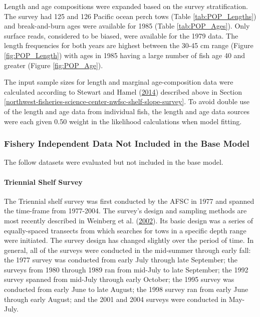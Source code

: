 \documentclass[12pt,]{article}
\let\oldparagraph\paragraph
\renewcommand{\paragraph}[1]{\oldparagraph{#1}\mbox{}}
\begin{document}
Length and age compositions were expanded based on the survey
stratification. The survey had 125 and 126 Pacific ocean perch tows
(Table \ref{tab:POP_Lengths}) and break-and-burn ages were available for
1985 (Table \ref{tab:POP_Ages}). Only surface reads, considered to be
biased, were available for the 1979 data. The length frequencies for
both years are highest between the 30-45 cm range (Figure
\ref{fig:POP_Length}) with ages in 1985 having a large number of fish
age 40 and greater (Figure \ref{fig:POP_Age}).

The input sample sizes for length and marginal age-composition data were
calculated according to Stewart and Hamel
(\protect\hyperlink{ref-stewart_bootstrapping_2014}{2014}) described
above in Section
\ref{northwest-fisheries-science-center-nwfsc-shelf-slope-survey}. To
avoid double use of the length and age data from individual fish, the
length and age data sources were each given 0.50 weight in the
likelihood calculations when model fitting.

\subsubsection{Fishery Independent Data Not Included in the Base
Model}\label{fishery-independent-data-not-included-in-the-base-model}

The follow datasets were evaluated but not included in the base model.

\paragraph{Triennial Shelf Survey}\label{triennial-shelf-survey}

The Triennial shelf survey was first conducted by the AFSC in 1977 and
spanned the time-frame from 1977-2004. The survey's design and sampling
methods are most recently described in Weinberg et al.
(\protect\hyperlink{ref-weinberg_estimation_2002}{2002}). Its basic
design was a series of equally-spaced transects from which searches for
tows in a specific depth range were initiated. The survey design has
changed slightly over the period of time. In general, all of the surveys
were conducted in the mid-summer through early fall: the 1977 survey was
conducted from early July through late September; the surveys from 1980
through 1989 ran from mid-July to late September; the 1992 survey
spanned from mid-July through early October; the 1995 survey was
conducted from early June to late August; the 1998 survey ran from early
June through early August; and the 2001 and 2004 surveys were conducted
in May-July.
\end{document}
